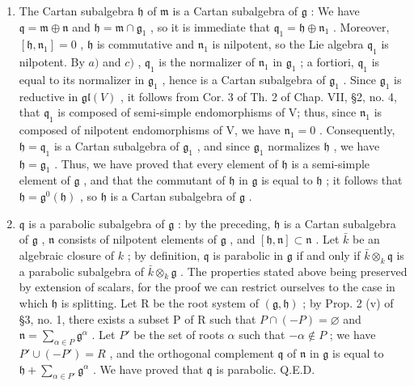 \begin{enumerate}
\def\labelenumi{\alph{enumi})}
\setcounter{enumi}{3}
\item
  The Cartan subalgebra \(\mathfrak{h}\) of \(\mathfrak{m}\) is a Cartan subalgebra of \(\mathfrak{g}\) : We have \(\mathfrak{q} = \mathfrak{m} \oplus \mathfrak{n}\) and \(\mathfrak{h} = \mathfrak{m} \cap \mathfrak{g}_1\) , so it is immediate that \(\mathfrak{q}_1 = \mathfrak{h} \oplus \mathfrak{n}_1\) . Moreover, \([\mathfrak{h}, \mathfrak{n}_1] = 0\) , \(\mathfrak{h}\) is commutative and \(\mathfrak{n}_1\) is nilpotent, so the Lie algebra \(\mathfrak{q}_1\) is nilpotent. By \(a)\) and \(c)\) , \(\mathfrak{q}_1\) is the normalizer of \(\mathfrak{n}_1\) in \(\mathfrak{g}_1\) ; a fortiori, \(\mathfrak{q}_1\) is equal to its normalizer in \(\mathfrak{g}_1\) , hence is a Cartan subalgebra of \(\mathfrak{g}_1\) . Since \(\mathfrak{g}_1\) is reductive in \(\mathfrak{gl}(V)\) , it follows from Cor. 3 of Th. 2 of Chap. VII, §2, no. 4, that \(\mathfrak{q}_1\) is composed of semi-simple endomorphisms of V; thus, since \(\mathfrak{n}_1\) is composed of nilpotent endomorphisms of V, we have \(\mathfrak{n}_1 = 0\) . Consequently, \(\mathfrak{h} = \mathfrak{q}_1\) is a Cartan subalgebra of \(\mathfrak{g}_1\) , and since \(\mathfrak{g}_1\) normalizes \(\mathfrak{h}\) , we have \(\mathfrak{h} = \mathfrak{g}_1\) . Thus, we have proved that every element of \(\mathfrak{h}\) is a semi-simple element of \(\mathfrak{g}\) , and that the commutant of \(\mathfrak{h}\) in \(\mathfrak{g}\) is equal to \(\mathfrak{h}\) ; it follows that \(\mathfrak{h} = \mathfrak{g}^0(\mathfrak{h})\) , so \(\mathfrak{h}\) is a Cartan subalgebra of \(\mathfrak{g}\) .
\item
  \(\mathfrak{q}\) is a parabolic subalgebra of \(\mathfrak{g}\) : by the preceding, \(\mathfrak{h}\) is a Cartan subalgebra of \(\mathfrak{g}\) , \(\mathfrak{n}\) consists of nilpotent elements of \(\mathfrak{g}\) , and \([\mathfrak{h},\mathfrak{n}]\subset \mathfrak{n}\) . Let \(\bar{k}\) be an algebraic closure of \(k\) ; by definition, \(\mathfrak{q}\) is parabolic in \(\mathfrak{g}\) if and only if \(\bar{k}\otimes_k\mathfrak{q}\) is a parabolic subalgebra of \(\bar{k}\otimes_k\mathfrak{g}\) . The properties stated above being preserved by extension of scalars, for the proof we can restrict ourselves to the case in which \(\mathfrak{h}\) is splitting. Let R be the root system of \((\mathfrak{g},\mathfrak{h})\) ; by Prop. 2 (v) of §3, no. 1, there exists a subset P of R such that \(P\cap (-P) = \varnothing\) and \(\mathfrak{n} = \sum_{\alpha \in P}\mathfrak{g}^{\alpha}\) . Let \(P'\) be the set of roots \(\alpha\) such that \(-\alpha\notin P\) ; we have \(P' \cup (-P') = R\) , and the orthogonal complement \(\mathfrak{q}\) of \(\mathfrak{n}\) in \(\mathfrak{g}\) is equal to \(\mathfrak{h} + \sum_{\alpha \in P'}\mathfrak{g}^{\alpha}\) . We have proved that \(\mathfrak{q}\) is parabolic. Q.E.D.
\end{enumerate}

